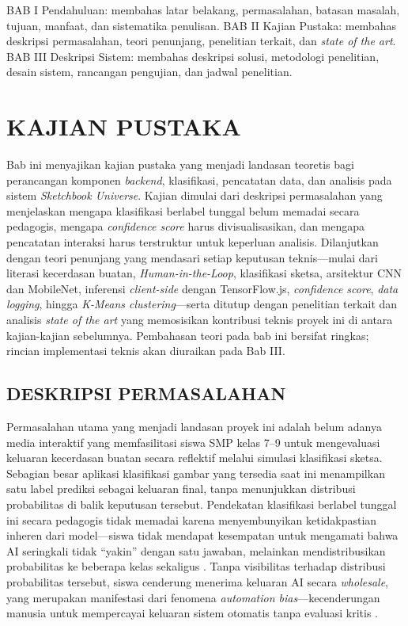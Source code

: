 \documentclass[12pt,a4paper,oneside,openany]{report}
\begin{document}
BAB I Pendahuluan: membahas latar belakang, permasalahan, batasan masalah, tujuan, manfaat, dan sistematika penulisan. BAB II Kajian Pustaka: membahas deskripsi permasalahan, teori penunjang, penelitian terkait, dan \textit{state of the art}. BAB III Deskripsi Sistem: membahas deskripsi solusi, metodologi penelitian, desain sistem, rancangan pengujian, dan jadwal penelitian.

\chapter{KAJIAN PUSTAKA}
\label{chap:bab2}

Bab ini menyajikan kajian pustaka yang menjadi landasan teoretis bagi perancangan komponen \textit{backend}, klasifikasi, pencatatan data, dan analisis pada sistem \textit{Sketchbook Universe}. Kajian dimulai dari deskripsi permasalahan yang menjelaskan mengapa klasifikasi berlabel tunggal belum memadai secara pedagogis, mengapa \textit{confidence score} harus divisualisasikan, dan mengapa pencatatan interaksi harus terstruktur untuk keperluan analisis. Dilanjutkan dengan teori penunjang yang mendasari setiap keputusan teknis---mulai dari literasi kecerdasan buatan, \textit{Human-in-the-Loop}, klasifikasi sketsa, arsitektur CNN dan MobileNet, inferensi \textit{client-side} dengan TensorFlow.js, \textit{confidence score}, \textit{data logging}, hingga \textit{K-Means clustering}---serta ditutup dengan penelitian terkait dan analisis \textit{state of the art} yang memosisikan kontribusi teknis proyek ini di antara kajian-kajian sebelumnya. Pembahasan teori pada bab ini bersifat ringkas; rincian implementasi teknis akan diuraikan pada Bab III.

\section{DESKRIPSI PERMASALAHAN}
\label{sec:deskripsi-permasalahan}

Permasalahan utama yang menjadi landasan proyek ini adalah belum adanya media interaktif yang memfasilitasi siswa SMP kelas 7--9 untuk mengevaluasi keluaran kecerdasan buatan secara reflektif melalui simulasi klasifikasi sketsa. Sebagian besar aplikasi klasifikasi gambar yang tersedia saat ini menampilkan satu label prediksi sebagai keluaran final, tanpa menunjukkan distribusi probabilitas di balik keputusan tersebut. Pendekatan klasifikasi berlabel tunggal ini secara pedagogis tidak memadai karena menyembunyikan ketidakpastian inheren dari model---siswa tidak mendapat kesempatan untuk mengamati bahwa AI seringkali tidak ``yakin'' dengan satu jawaban, melainkan mendistribusikan probabilitas ke beberapa kelas sekaligus \cite{ref1}. Tanpa visibilitas terhadap distribusi probabilitas tersebut, siswa cenderung menerima keluaran AI secara \textit{wholesale}, yang merupakan manifestasi dari fenomena \textit{automation bias}---kecenderungan manusia untuk mempercayai keluaran sistem otomatis tanpa evaluasi kritis \cite{ref4}.
\end{document}
